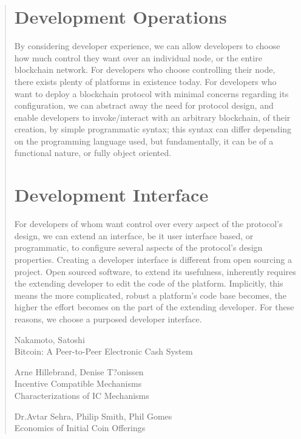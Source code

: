 \documentclass[12pt, titlepage, twocolumn]{report}
\begin{document}
\begin{quotation}
\section{Development Operations}
By considering developer experience, we can allow developers to choose how much control they want over an individual node, or the entire blockchain network. For developers who choose controlling their node, there exists plenty of platforms in existence today. For developers who want to deploy a blockchain protocol with minimal concerns regarding its configuration, we can abstract away the need for protocol design, and enable developers to invoke/interact with an arbitrary blockchain, of their creation, by simple programmatic syntax; this syntax can differ depending on the programming language used, but fundamentally, it can be of a functional nature, or fully object oriented.

\section{Development Interface}
For developers of whom want control over every aspect of the protocol's design, we can extend an interface, be it user interface based, or programmatic, to configure several aspects of the protocol's design properties. Creating a developer interface is different from open sourcing a project. Open sourced software, to extend its usefulness, inherently requires the extending developer to edit the code of the platform. Implicitly, this means the more complicated, robust a platform's code base becomes, the higher the effort becomes on the part of the extending developer. For these reasons, we choose a purposed developer interface.








\begin{thebibliography}{20}

Nakamoto, Satoshi \\
Bitcoin: A Peer-to-Peer Electronic Cash System

 Arne Hillebrand, Denise T?onissen \\
Incentive Compatible Mechanisms \\ 
Characterizations of IC Mechanisms

 Dr.Avtar Sehra, Philip Smith, Phil Gomes\\
Economics of Initial Coin Offerings


\end{thebibliography}
\end{quotation}
\end{document}
